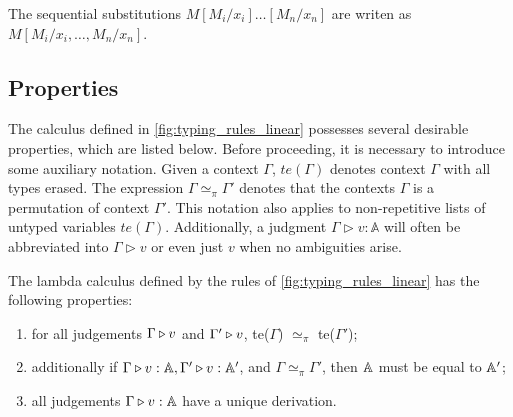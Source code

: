 The sequential substitutions $M[M_i/x_i] \ldots [M_n/x_n]$ are writen as $M[M_i/x_i, \ldots ,M_n/x_n]$.


\subsection{Properties}


The calculus defined in \autoref{fig:typing_rules_linear} possesses several desirable properties, which are listed below. Before proceeding, it is necessary to introduce some auxiliary notation. Given a context $\Gamma$, $te(\Gamma)$ denotes context $\Gamma$ with all types erased. The expression $\Gamma \simeq_{\pi} \Gamma'$ denotes that the contexts $\Gamma$ is a permutation of context $\Gamma'$. This notation also applies to non-repetitive lists of untyped variables $te(\Gamma)$. Additionally, a judgment $\Gamma \triangleright v: \mathbb{A}$ will often be abbreviated into $\Gamma \triangleright v $ or even just $v$ when no ambiguities arise.


\begin{theorem} \label {theorem:unique_der}
   The lambda calculus defined by the rules of \autoref{fig:typing_rules_linear} has the following properties:
   \begin{enumerate}
     \item\label{perm} for all judgements $\Gamma \triangleright v$ and $\Gamma'
             \triangleright v$, te($\Gamma$) $\simeq_{\pi}$  te($\Gamma'$); 
     \item\label{type} additionally if $\Gamma \triangleright v: \mathbb{A},
       \Gamma' \triangleright v: \mathbb{A}'$, and $\Gamma \simeq_{\pi}
       \Gamma'$, then $\mathbb{A}$ must be equal to $\mathbb{A}'$;
     \item\label{der} all judgements $\Gamma \triangleright v:\mathbb{A}$ have a unique derivation.
\end{enumerate}
\end{theorem}

